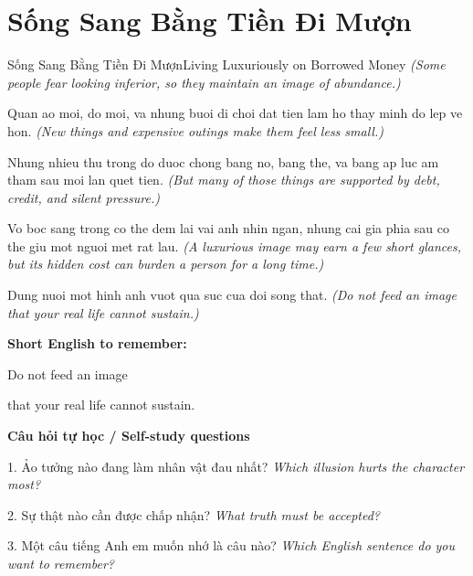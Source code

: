 \section{Sống Sang Bằng Tiền Đi Mượn}
\begin{truyen}{Sống Sang Bằng Tiền Đi Mượn}{Living Luxuriously on Borrowed Money}
\textit{(Some people fear looking inferior, so they maintain an image of abundance.)}

Quan ao moi, do moi, va nhung buoi di choi dat tien lam ho thay minh do lep ve hon.
\textit{(New things and expensive outings make them feel less small.)}

Nhung nhieu thu trong do duoc chong bang no, bang the, va bang ap luc am tham sau moi lan quet tien.
\textit{(But many of those things are supported by debt, credit, and silent pressure.)}

Vo boc sang trong co the dem lai vai anh nhin ngan, nhung cai gia phia sau co the giu mot nguoi met rat lau.
\textit{(A luxurious image may earn a few short glances, but its hidden cost can burden a person for a long time.)}

\end{truyen}

\begin{baihoc}
Dung nuoi mot hinh anh vuot qua suc cua doi song that.
\textit{(Do not feed an image that your real life cannot sustain.)}
\end{baihoc}

\begin{ghinhoanh}
\textbf{Short English to remember:}

Do not feed an image

that your real life cannot sustain.

\end{ghinhoanh}

\begin{tuhocnhanh}
\textbf{Câu hỏi tự học / Self-study questions}

1. Ảo tưởng nào đang làm nhân vật đau nhất? \textit{Which illusion hurts the character most?}

2. Sự thật nào cần được chấp nhận? \textit{What truth must be accepted?}

3. Một câu tiếng Anh em muốn nhớ là câu nào? \textit{Which English sentence do you want to remember?}
\end{tuhocnhanh}
\ngancach

